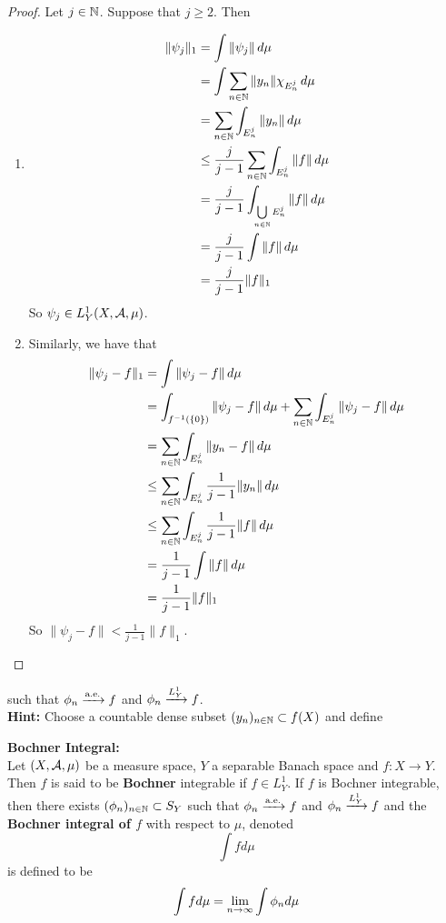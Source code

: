 \documentclass{book}
\begin{document}
	\begin{proof}	
	Let $j \in \mathbb{N}$. 
	Suppose that $j \geq 2$. Then 
	\begin{enumerate}
		\item \begin{align*}
			\|\psi_j\|_1 
			& = \int \|\psi_j\| \, d \mu \\
			& = \int \sum_{n \in \mathbb{N}} \|y_n\| \chi_{E_n^j} \, d \mu \\
			& =  \sum_{n \in \mathbb{N}} \int_{E_n^j} \|y_n\| \, d \mu \\
			& \leq \frac{j}{j-1} \sum_{n \in \mathbb{N}} \int_{E_n^j} \|f\| \, d \mu \\
			& = \frac{j}{j-1} \int_{\bigcup\limits_{n \in \mathbb{N}} E_n^j} \|f\| \, d \mu \\
			& = \frac{j}{j-1} \int \|f\| \, d \mu \\
			& = \frac{j}{j-1} \|f\|_1
		\end{align*}
		So $\psi_j \in L^1_Y(X, \mathcal{A}, \mu)$. 
		\item Similarly, we have that
		\begin{align*}
			\|\psi_j - f\|_1 
			& = \int \|\psi_j - f\| \, d \mu \\
			& = \int_{f^{-1}(\{0\})} \|\psi_j - f\| \, d \mu +  \sum_{n \in \mathbb{N}} \int_{E_n^j} \|\psi_j - f\| \, d \mu \\
			& = \sum_{n \in \mathbb{N}} \int_{E_n^j} \|y_n - f\| \, d \mu \\
			& \leq  \sum_{n \in \mathbb{N}} \int_{E_n^j}  \frac{1}{j - 1} \|y_n\| \, d \mu \\
			& \leq  \sum_{n \in \mathbb{N}} \int_{E_n^j}  \frac{1}{j - 1} \|f\| \, d \mu \\
			& =  \frac{1}{j - 1} \int \|f\| \, d \mu \\
			& =  \frac{1}{j - 1} \|f\|_1
		\end{align*}
		So $\|\psi_j - f\| < \frac{1}{j - 1} \|f\|_1$.
	\end{enumerate}
	\end{proof}	

	\begin{ex}
		such that $\phi_n \xrightarrow{\text{a.e.}} f$ and $\phi_n \xrightarrow{L_Y^1} f$.\\
		\textbf{Hint:} Choose a countable dense subset $(y_n)_{n \in \mathbb{N}} \subset f(X)$ and define 
	\end{ex}	
	
	\begin{defn}  \textbf{Bochner Integral:}\\
	Let $(X, \mathcal{A}, \mu)$ be a measure space, $Y$ a separable Banach space and $f:X \rightarrow Y$. Then $f$ is said to be \textbf{Bochner} integrable if $f \in L^1_Y$. If $f$ is Bochner integrable, then there exists $(\phi_n)_{n \in \mathbb{N}} \subset S_Y$ such that $\phi_n \xrightarrow{\text{a.e.}} f$ and $\phi_n \xrightarrow{L_Y^1} f$ and the \textbf{Bochner integral of $f$} with respect to $\mu$, denoted $$\int f d\mu$$ is defined to be $$\int f d\mu = \lim \limits_{n \rightarrow \infty} \int \phi_n d\mu$$ 
	\end{defn}
	
\end{document}
